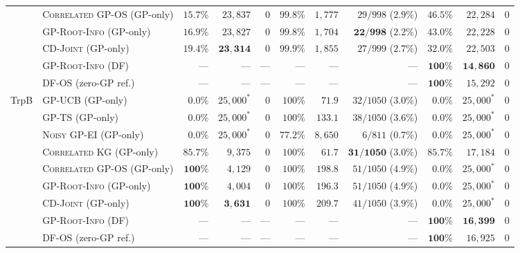 \documentclass{article}
\theoremstyle{plain}
\theoremstyle{definition}
\begin{document}
\begin{table}[!htbp]
{\begin{tabular}{@{}llrrrrrrrrr@{}}
 & \textsc{Correlated GP-OS} (GP-only) & $15.7\%$ & $23{,}837$ & $0$ & $99.8\%$ & $1{,}777$ & $29/998$ ($2.9\%$) & $46.5\%$ & $22{,}284$ & $0$ \\
 & \textsc{GP-Root-Info} (GP-only) & $16.9\%$ & $23{,}827$ & $0$ & $99.8\%$ & $1{,}704$ & $\mathbf{22/998}$ ($2.2\%$) & $43.0\%$ & $22{,}228$ & $0$ \\
 & \textsc{CD-Joint} (GP-only) & $\mathbf{19.4\%}$ & $\mathbf{23{,}314}$ & $0$ & $99.9\%$ & $1{,}855$ & $27/999$ ($2.7\%$) & $32.0\%$ & $22{,}503$ & $0$ \\
 \cmidrule(lr){2-11}
 & \textsc{GP-Root-Info (DF)} & --- & --- & --- & --- & --- & --- & $\mathbf{100\%}$ & $\mathbf{14{,}860}$ & $0$ \\
 & \textsc{DF-OS} (zero-GP ref.) & --- & --- & --- & --- & --- & --- & $\mathbf{100\%}$ & $15{,}292$ & $0$ \\
\midrule
\multirow{9}{*}{TrpB}
 & \textsc{GP-UCB} (GP-only) & $0.0\%$ & $25{,}000^*$ & $0$ & $100\%$ & $71.9$ & $32/1050$ ($3.0\%$) & $0.0\%$ & $25{,}000^*$ & $0$ \\
 & \textsc{GP-TS} (GP-only) & $0.0\%$ & $25{,}000^*$ & $0$ & $100\%$ & $133.1$ & $38/1050$ ($3.6\%$) & $0.0\%$ & $25{,}000^*$ & $0$ \\
 & \textsc{Noisy GP-EI} (GP-only) & $0.0\%$ & $25{,}000^*$ & $0$ & $77.2\%$ & $8{,}650$ & $6/811$ ($0.7\%$) & $0.0\%$ & $25{,}000^*$ & $0$ \\
 & \textsc{Correlated KG} (GP-only) & $85.7\%$ & $9{,}375$ & $0$ & $100\%$ & $\mathbf{61.7}$ & $\mathbf{31/1050}$ ($3.0\%$) & $85.7\%$ & $17{,}184$ & $0$ \\
 & \textsc{Correlated GP-OS} (GP-only) & $\mathbf{100\%}$ & $4{,}129$ & $0$ & $100\%$ & $198.8$ & $51/1050$ ($4.9\%$) & $0.0\%$ & $25{,}000^*$ & $0$ \\
 & \textsc{GP-Root-Info} (GP-only) & $\mathbf{100\%}$ & $4{,}004$ & $0$ & $100\%$ & $196.3$ & $51/1050$ ($4.9\%$) & $0.0\%$ & $25{,}000^*$ & $0$ \\
 & \textsc{CD-Joint} (GP-only) & $\mathbf{100\%}$ & $\mathbf{3{,}631}$ & $0$ & $100\%$ & $209.7$ & $41/1050$ ($3.9\%$) & $0.0\%$ & $25{,}000^*$ & $0$ \\
 \cmidrule(lr){2-11}
 & \textsc{GP-Root-Info (DF)} & --- & --- & --- & --- & --- & --- & $\mathbf{100\%}$ & $\mathbf{16{,}399}$ & $0$ \\
 & \textsc{DF-OS} (zero-GP ref.) & --- & --- & --- & --- & --- & --- & $\mathbf{100\%}$ & $16{,}925$ & $0$ \\
\bottomrule
\end{tabular}%
}
\end{table}
\end{document}
